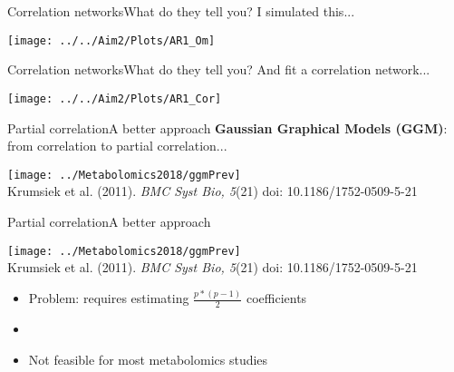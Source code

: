 \documentclass[xcolor=dvipsnames]{beamer}
\begin{document}
\begin{frame}{Correlation networks}{What do they tell you?}
	{I simulated this...}
	\begin{center}
		\texttt{[image: ../../Aim2/Plots/AR1\_Om]}
	\end{center}
\end{frame}

\begin{frame}{Correlation networks}{What do they tell you?}
	{And fit a correlation network...}
	\begin{center}
		\texttt{[image: ../../Aim2/Plots/AR1\_Cor]}
	\end{center}
\end{frame}

\begin{frame}{Partial correlation}{A better approach}
	\vspace{-15.5pt}
	{\Large \textbf{Gaussian Graphical Models (GGM)}: from correlation to partial correlation...}
	
	\begin{center}
		\texttt{[image: ../Metabolomics2018/ggmPrev]} \\
		Krumsiek et al. (2011). \emph{BMC Syst Bio, 5}(21) doi: 10.1186/1752-0509-5-21
	\end{center}
\end{frame}

\begin{frame}{Partial correlation}{A better approach}
	\vspace{-15.5pt}
	\begin{center}
		\texttt{[image: ../Metabolomics2018/ggmPrev]} \\
		Krumsiek et al. (2011). \emph{BMC Syst Bio, 5}(21) doi: 10.1186/1752-0509-5-21
	\end{center} \pause
	\begin{itemize}
		\item Problem: requires estimating $\frac{p*(p-1)}{2}$ coefficients
		\item[]
		\item Not feasible for most metabolomics studies 
	\end{itemize}
\end{frame}
\end{document}
